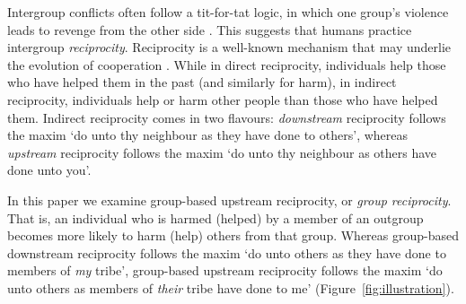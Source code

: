 \documentclass[12pt,a4paper]{article}\usepackage[]{graphicx}\usepackage[]{color}
\begin{document}
Intergroup conflicts often follow a tit-for-tat logic, in which one group's
violence leads to revenge from the other side
\citep{horowitz2001thedeadly,horowitz1985ethnicgroups,chagnon1988lifehistories,haushofer_both_2010,shayo2010judicial}.
This suggests that humans practice intergroup \emph{reciprocity}. Reciprocity is
a well-known mechanism that may underlie the evolution of cooperation
\citep{nowak2006five,nowak2012evolving}. While in direct reciprocity,
individuals help those who have helped them in the past (and similarly for
harm), in indirect reciprocity, individuals help or harm other people than those
who have helped them.  Indirect reciprocity comes in two flavours:
\emph{downstream} reciprocity follows the maxim `do unto thy neighbour as they
have done to others', whereas \emph{upstream} reciprocity follows the maxim `do
unto thy neighbour as others have done unto you'. 

In this paper we examine
group-based upstream reciprocity, or \emph{group reciprocity}. That is, an
individual who is harmed (helped) by a member of an outgroup becomes more likely
to harm (help) others from that group.  Whereas group-based downstream
reciprocity \citep{bernhard2006group,bernhard2006parochial} follows the maxim
`do unto others as they have done to members of \emph{my} tribe', group-based
upstream reciprocity follows the maxim `do unto others as members of
\emph{their} tribe have done to me' (Figure~\ref{fig:illustration}).
\end{document}
